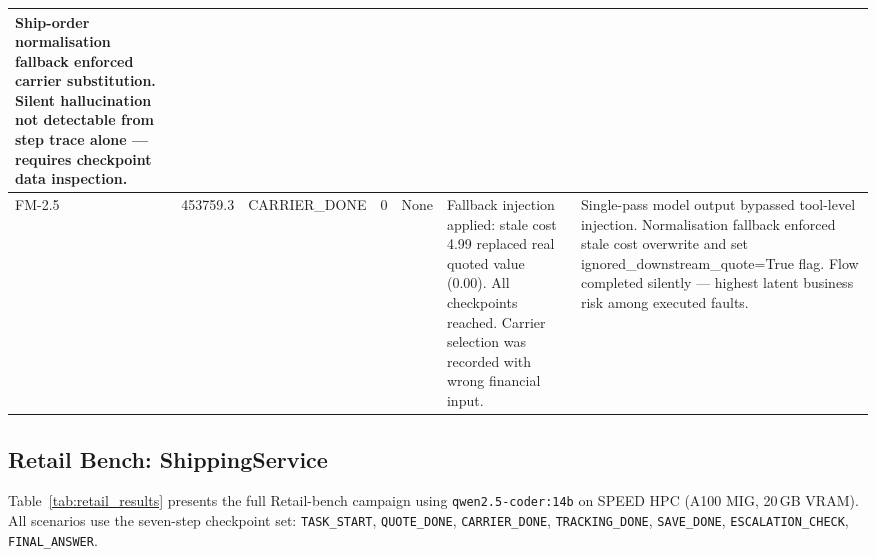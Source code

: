 \documentclass[conference]{IEEEtran}
\begin{document}
\begin{table}[!t]
{\begin{tabular}{p{1.6cm}p{1.6cm}p{2.1cm}p{1.6cm}p{2.8cm}p{3.6cm}p{3.8cm}}
    Ship-order normalisation fallback enforced carrier substitution. Silent
    hallucination not detectable from step trace alone --- requires checkpoint
    data inspection. \\
\midrule
FM-2.5
  & 453759.3
  & CARRIER\_DONE
  & 0
  & None
  & Fallback injection applied: stale cost 4.99 replaced real quoted value (0.00).
    All checkpoints reached. Carrier selection was recorded with wrong financial
    input.
  & Single-pass model output bypassed tool-level injection. Normalisation
    fallback enforced stale cost overwrite and set ignored\_downstream\_quote=True
    flag. Flow completed silently --- highest latent business risk among executed
    faults. \\
\bottomrule
\end{tabular}%
}
\end{table}

\subsection{Retail Bench: ShippingService}

Table~\ref{tab:retail_results} presents the full Retail-bench campaign using
\texttt{qwen2.5-coder:14b} on SPEED HPC (A100 MIG, 20\,GB VRAM). All scenarios
use the seven-step checkpoint set: \texttt{TASK\_START}, \texttt{QUOTE\_DONE},
\texttt{CARRIER\_DONE}, \texttt{TRACKING\_DONE}, \texttt{SAVE\_DONE},
\texttt{ESCALATION\_CHECK}, \texttt{FINAL\_ANSWER}.
\end{document}
